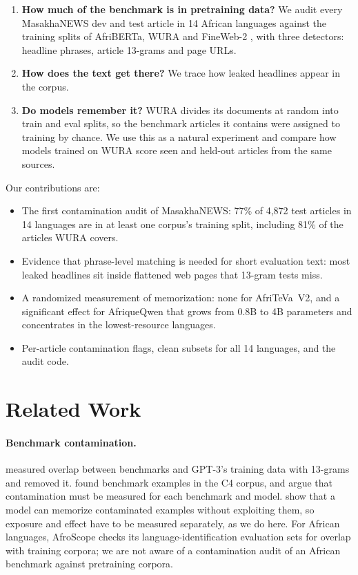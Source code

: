 \documentclass[11pt]{article}
\begin{document}
\begin{enumerate}
\item \textbf{How much of the benchmark is in pretraining data?} We audit every MasakhaNEWS dev and test article in 14 African languages against the training splits of AfriBERTa, WURA \citep{oladipo2023wura} and FineWeb-2 \citep{penedo2025fineweb2}, with three detectors: headline phrases, article 13-grams and page URLs.
\item \textbf{How does the text get there?} We trace how leaked headlines appear in the corpus.
\item \textbf{Do models remember it?} WURA divides its documents at random into train and eval splits, so the benchmark articles it contains were assigned to training by chance. We use this as a natural experiment and compare how models trained on WURA score seen and held-out articles from the same sources.
\end{enumerate}

\noindent Our contributions are:
\begin{itemize}
\item The first contamination audit of MasakhaNEWS: 77\% of 4,872 test articles in 14 languages are in at least one corpus's training split, including 81\% of the articles WURA covers.
\item Evidence that phrase-level matching is needed for short evaluation text: most leaked headlines sit inside flattened web pages that 13-gram tests miss.
\item A randomized measurement of memorization: none for AfriTeVa~V2, and a significant effect for AfriqueQwen \citep{yu2026afriquellm} that grows from 0.8B to 4B parameters and concentrates in the lowest-resource languages.
\item Per-article contamination flags, clean subsets for all 14 languages, and the audit code.
\end{itemize}

\section{Related Work}

\paragraph{Benchmark contamination.} \citet{brown2020gpt3} measured overlap between benchmarks and GPT-3's training data with 13-grams and removed it. \citet{dodge2021c4} found benchmark examples in the C4 corpus, and \citet{sainz2023trouble} argue that contamination must be measured for each benchmark and model. \citet{magar2022contamination} show that a model can memorize contaminated examples without exploiting them, so exposure and effect have to be measured separately, as we do here. For African languages, AfroScope \citep{kwon2026afroscope} checks its language-identification evaluation sets for overlap with training corpora; we are not aware of a contamination audit of an African benchmark against pretraining corpora.
\end{document}
